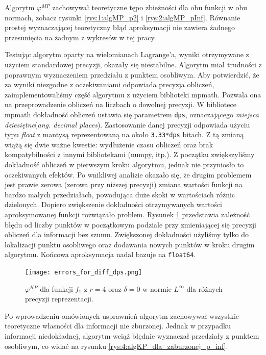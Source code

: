 \documentclass[oik, pdftex, man]{mgrwms}
\begin{document}
    Algorytm $\varphi^{MP}$ zachowywał teoretyczne tępo zbieżności dla obu funkcji w obu normach, zobacz rysunki \ref{rys:1:algMP_p2} i \ref{rys:2:algMP_pInf}. Równanie prostej wyznaczającej teoretyczny błąd aproksymacji nie zawiera żadnego przesunięcia na żadnym z wykresów w tej pracy.

    Testując algorytm oparty na wielomianach Lagrange'a, wyniki otrzymywane z użyciem standardowej precyzji, okazały się niestabilne. Algorytm miał trudności z poprawnym wyznaczeniem przedziału z punktem osobliwym.
    Aby potwierdzić, że za wyniki niezgodne z oczekiwaniami odpowiada precyzja obliczeń, zaimplementowaliśmy część algorytmu z użyciem biblioteki mpmath. Pozwala ona na przeprowadzenie obliczeń na liczbach o dowolnej precyzji. W bibliotece mpmath dokładność obliczeń ustawia się parametrem \verb+dps+, oznaczającego \textit{miejsca dziesiętne}(\textit{ang. decimal places}). Zastosowanie danej precyzji odpowiada użyciu typu \textit{float} z mantysą reprezentowaną na około \verb+3.33*dps+ bitach. Z tą zmianą wiążą się dwie ważne kwestie: wydłużenie czasu obliczeń oraz brak kompatybilności z innymi bibliotekami (numpy, itp.).
    Z początku zwiększyliśmy dokładność obliczeń w pierwszym kroku algorytmu, jednak nie przyniosło to oczekiwanych efektów. Po wnikliwej analizie okazało się, że drugim problemem jest prawie zerowa (zerowa przy niższej precyzji) zmiana wartości funkcji na bardzo małych przedziałach, powodująca duże skoki w wartościach różnic dzielonych. Dopiero zwiększenie dokładności otrzymywanych wartości aproksymowanej funkcji rozwiązało problem. Rysunek \ref{rys:3:diff_dps} przedstawia zależność błędu od liczby punktów w początkowym podziale przy zmieniającej się precyzji obliczeń dla informacji bez szumu. Zwiększonej dokładności użyliśmy tylko do lokalizacji punktu osobliwego oraz dodawania nowych punktów w kroku drugim algorytmu. Końcowa aproksymacja nadal bazuje na \verb+float64+.
    \begin{figure}
        \centering
        \texttt{[image: errors\_for\_diff\_dps.png]}
        \caption{$\varphi^{KP}$ dla funkcji $f_{1}$ z $r = 4$ oraz $\delta = 0$ w normie $L^{\infty}$ dla różnych precyzji reprezentacji.}
        \label{rys:3:diff_dps}
    \end{figure}
    Po wprowadzeniu omówionych usprawnień algorytm zachowywał wszystkie teoretyczne własności dla informacji nie zburzonej. Jednak w przypadku informacji niedokładnej, algorytm wciąż błędnie wyznaczał przedziały z punktem osobliwym, co widać na rysunku \ref{rys:4:algKP_dla_zaburzonej_p_inf}.
\end{document}
